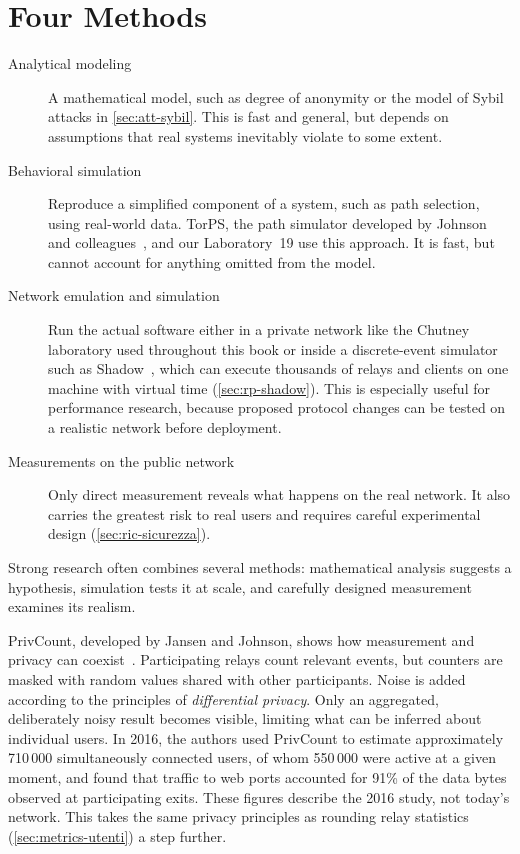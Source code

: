 \section{Four Methods}\label{sec:ric-metodi}

\begin{description}
  \item[Analytical modeling] A mathematical model, such as degree of anonymity or the model of Sybil attacks in \cref{sec:att-sybil}. This is fast and general, but depends on assumptions that real systems inevitably violate to some extent.
  \item[Behavioral simulation] Reproduce a simplified component of a system, such as path selection, using real-world data. TorPS, the path simulator developed by Johnson and colleagues~\cite{johnson2013users}, and our Laboratory~19 use this approach. It is fast, but cannot account for anything omitted from the model.
  \item[Network emulation and simulation] Run the actual software either in a private network like the Chutney laboratory used throughout this book or inside a discrete-event simulator such as Shadow~\cite{jansen2012shadow}, which can execute thousands of relays and clients on one machine with virtual time (\cref{sec:rp-shadow}). This is especially useful for performance research, because proposed protocol changes can be tested on a realistic network before deployment.
  \item[Measurements on the public network] Only direct measurement reveals what happens on the real network. It also carries the greatest risk to real users and requires careful experimental design (\cref{sec:ric-sicurezza}).
\end{description}
Strong research often combines several methods: mathematical analysis suggests a hypothesis, simulation tests it at scale, and carefully designed measurement examines its realism.

\begin{approfondimento}
PrivCount, developed by Jansen and Johnson, shows how measurement and privacy can coexist~\cite{jansen2016privcount}. Participating relays count relevant events, but counters are masked with random values shared with other participants. Noise is added according to the principles of \emph{differential privacy}. Only an aggregated, deliberately noisy result becomes visible, limiting what can be inferred about individual users. In 2016, the authors used PrivCount to estimate approximately 710\,000 simultaneously connected users, of whom 550\,000 were active at a given moment, and found that traffic to web ports accounted for 91\% of the data bytes observed at participating exits. These figures describe the 2016 study, not today's network. This takes the same privacy principles as rounding relay statistics (\cref{sec:metrics-utenti}) a step further.

\end{approfondimento}

